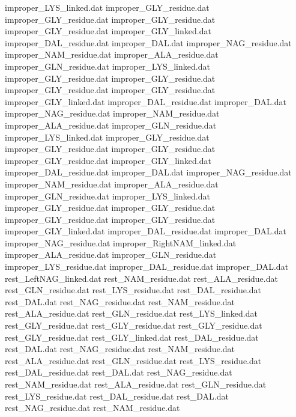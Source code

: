 improper_LYS_linked.dat         
improper_GLY_residue.dat
improper_GLY_residue.dat
improper_GLY_residue.dat
improper_GLY_residue.dat
improper_GLY_linked.dat
improper_DAL_residue.dat        
improper_DAL.dat                
improper_NAG_residue.dat        
improper_NAM_residue.dat        
improper_ALA_residue.dat        
improper_GLN_residue.dat        
improper_LYS_linked.dat         
improper_GLY_residue.dat
improper_GLY_residue.dat
improper_GLY_residue.dat
improper_GLY_residue.dat
improper_GLY_linked.dat
improper_DAL_residue.dat        
improper_DAL.dat                
improper_NAG_residue.dat        
improper_NAM_residue.dat        
improper_ALA_residue.dat        
improper_GLN_residue.dat        
improper_LYS_linked.dat         
improper_GLY_residue.dat
improper_GLY_residue.dat
improper_GLY_residue.dat
improper_GLY_residue.dat
improper_GLY_linked.dat
improper_DAL_residue.dat        
improper_DAL.dat                
improper_NAG_residue.dat        
improper_NAM_residue.dat        
improper_ALA_residue.dat        
improper_GLN_residue.dat        
improper_LYS_linked.dat         
improper_GLY_residue.dat
improper_GLY_residue.dat
improper_GLY_residue.dat
improper_GLY_residue.dat
improper_GLY_linked.dat
improper_DAL_residue.dat        
improper_DAL.dat                
improper_NAG_residue.dat        
improper_RightNAM_linked.dat    
improper_ALA_residue.dat        
improper_GLN_residue.dat        
improper_LYS_residue.dat        
improper_DAL_residue.dat        
improper_DAL.dat                
rest_LeftNAG_linked.dat         
rest_NAM_residue.dat            
rest_ALA_residue.dat            
rest_GLN_residue.dat            
rest_LYS_residue.dat            
rest_DAL_residue.dat            
rest_DAL.dat                    
rest_NAG_residue.dat            
rest_NAM_residue.dat            
rest_ALA_residue.dat            
rest_GLN_residue.dat            
rest_LYS_linked.dat             
rest_GLY_residue.dat
rest_GLY_residue.dat
rest_GLY_residue.dat
rest_GLY_residue.dat
rest_GLY_linked.dat
rest_DAL_residue.dat            
rest_DAL.dat                    
rest_NAG_residue.dat            
rest_NAM_residue.dat            
rest_ALA_residue.dat            
rest_GLN_residue.dat            
rest_LYS_residue.dat            
rest_DAL_residue.dat            
rest_DAL.dat                    
rest_NAG_residue.dat            
rest_NAM_residue.dat            
rest_ALA_residue.dat            
rest_GLN_residue.dat            
rest_LYS_residue.dat            
rest_DAL_residue.dat            
rest_DAL.dat                    
rest_NAG_residue.dat            
rest_NAM_residue.dat            
